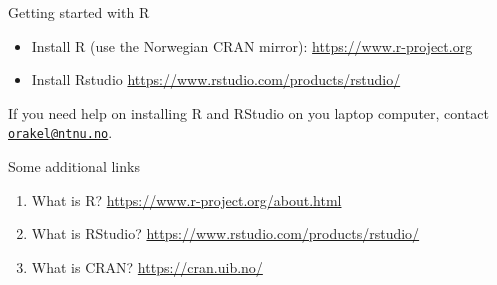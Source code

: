 \documentclass[
  10pt,
  ignorenonframetext,
]{beamer}
\providecommand{\tightlist}{%
  \setlength{\itemsep}{0pt}\setlength{\parskip}{0pt}}
\begin{document}
\begin{frame}{Getting started with R}
\protect\hypertarget{getting-started-with-r}{}
\vspace{2mm}

\begin{itemize}
\tightlist
\item
  Install R (use the Norwegian CRAN mirror):
  \url{https://www.r-project.org}
\end{itemize}

\vspace{2mm}

\begin{itemize}
\tightlist
\item
  Install Rstudio \url{https://www.rstudio.com/products/rstudio/}
\end{itemize}

\vspace{4mm}

If you need help on installing R and RStudio on you laptop computer,
contact \href{mailto:orakel@ntnu.no}{\nolinkurl{orakel@ntnu.no}}.
\end{frame}

\begin{frame}
\begin{block}{Some additional links}
\protect\hypertarget{some-additional-links}{}
\vspace{4mm}

\begin{enumerate}
[1)]
\item
  What is R? \url{https://www.r-project.org/about.html} \vspace{2mm}
\item
  What is RStudio? \url{https://www.rstudio.com/products/rstudio/}
  \vspace{2mm}
\item
  What is CRAN? \url{https://cran.uib.no/} \vspace{2mm}
\end{enumerate}
\end{block}
\end{frame}
\end{document}
